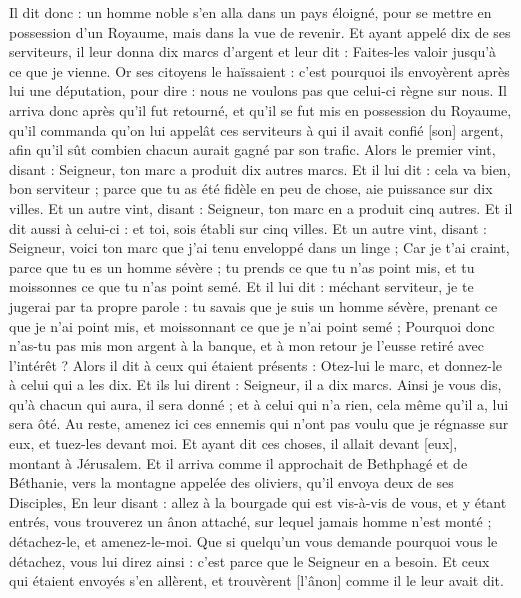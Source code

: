 \begin{multicols}{2}
Il dit donc : un homme noble s'en alla dans un pays éloigné, pour se mettre en possession d'un Royaume, mais dans la vue de revenir.
Et ayant appelé dix de ses serviteurs, il leur donna dix marcs d'argent et leur dit : Faites-les valoir jusqu'à ce que je vienne.
Or ses citoyens le haïssaient : c'est pourquoi ils envoyèrent après lui une députation, pour dire : nous ne voulons pas que celui-ci règne sur nous.
Il arriva donc après qu'il fut retourné, et qu'il se fut mis en possession du Royaume, qu'il commanda qu'on lui appelât ces serviteurs à qui il avait confié [son] argent, afin qu'il sût combien chacun aurait gagné par son trafic.
Alors le premier vint, disant : Seigneur, ton marc a produit dix autres marcs.
Et il lui dit : cela va bien, bon serviteur ; parce que tu as été fidèle en peu de chose, aie puissance sur dix villes.
Et un autre vint, disant : Seigneur, ton marc en a produit cinq autres.
Et il dit aussi à celui-ci : et toi, sois établi sur cinq villes.
Et un autre vint, disant : Seigneur, voici ton marc que j'ai tenu enveloppé dans un linge ;
Car je t'ai craint, parce que tu es un homme sévère ; tu prends ce que tu n'as point mis, et tu moissonnes ce que tu n'as point semé.
Et il lui dit : méchant serviteur, je te jugerai par ta propre parole : tu savais que je suis un homme sévère, prenant ce que je n'ai point mis, et moissonnant ce que je n'ai point semé ;
Pourquoi donc n'as-tu pas mis mon argent à la banque, et à mon retour je l'eusse retiré avec l'intérêt ?
Alors il dit à ceux qui étaient présents : Otez-lui le marc, et donnez-le à celui qui a les dix.
Et ils lui dirent : Seigneur, il a dix marcs.
Ainsi je vous dis, qu'à chacun qui aura, il sera donné ; et à celui qui n'a rien, cela même qu'il a, lui sera ôté.
Au reste, amenez ici ces ennemis qui n'ont pas voulu que je régnasse sur eux, et tuez-les devant moi.
Et ayant dit ces choses, il allait devant [eux], montant à Jérusalem.
Et il arriva comme il approchait de Bethphagé et de Béthanie, vers la montagne appelée des oliviers, qu'il envoya deux de ses Disciples,
En leur disant : allez à la bourgade qui est vis-à-vis de vous, et y étant entrés, vous trouverez un ânon attaché, sur lequel jamais homme n'est monté ; détachez-le, et amenez-le-moi.
Que si quelqu'un vous demande pourquoi vous le détachez, vous lui direz ainsi : c'est parce que le Seigneur en a besoin.
Et ceux qui étaient envoyés s'en allèrent, et trouvèrent [l'ânon] comme il le leur avait dit.

\end{multicols}
